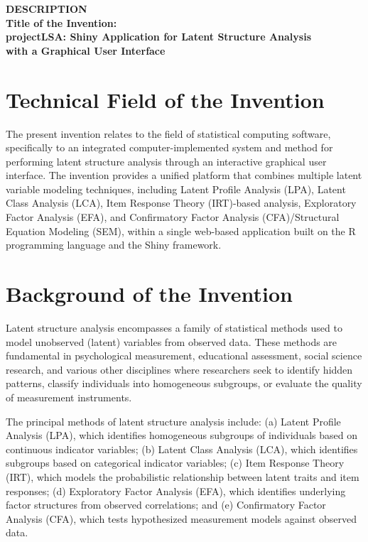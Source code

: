 \documentclass[12pt,a4paper]{article}
\begin{document}
\begin{center}
\textbf{\large DESCRIPTION}\\[12pt]
\textbf{\large Title of the Invention:}\\[6pt]
\textbf{projectLSA: Shiny Application for Latent Structure Analysis\\with a Graphical User Interface}
\end{center}

\vspace{12pt}

\section{Technical Field of the Invention}

The present invention relates to the field of statistical computing software, specifically to an integrated computer-implemented system and method for performing latent structure analysis through an interactive graphical user interface. The invention provides a unified platform that combines multiple latent variable modeling techniques, including Latent Profile Analysis (LPA), Latent Class Analysis (LCA), Item Response Theory (IRT)-based analysis, Exploratory Factor Analysis (EFA), and Confirmatory Factor Analysis (CFA)/Structural Equation Modeling (SEM), within a single web-based application built on the R programming language and the Shiny framework.

\section{Background of the Invention}

Latent structure analysis encompasses a family of statistical methods used to model unobserved (latent) variables from observed data. These methods are fundamental in psychological measurement, educational assessment, social science research, and various other disciplines where researchers seek to identify hidden patterns, classify individuals into homogeneous subgroups, or evaluate the quality of measurement instruments.

The principal methods of latent structure analysis include: (a) Latent Profile Analysis (LPA), which identifies homogeneous subgroups of individuals based on continuous indicator variables; (b) Latent Class Analysis (LCA), which identifies subgroups based on categorical indicator variables; (c) Item Response Theory (IRT), which models the probabilistic relationship between latent traits and item responses; (d) Exploratory Factor Analysis (EFA), which identifies underlying factor structures from observed correlations; and (e) Confirmatory Factor Analysis (CFA), which tests hypothesized measurement models against observed data.
\end{document}
